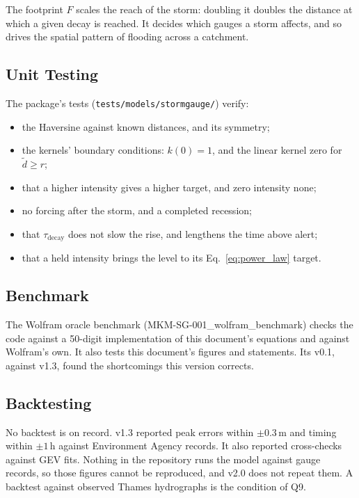 \documentclass[11pt,a4paper]{article}
\begin{document}
The footprint $F$ scales the reach of the storm: doubling it doubles the distance at
which a given decay is reached. It decides which gauges a storm affects, and so drives
the spatial pattern of flooding across a catchment.

\mkmvalidation

\subsection{Unit Testing}

The package's tests (\texttt{tests/models/stormgauge/}) verify:
\begin{itemize}[nosep]
    \item the Haversine against known distances, and its symmetry;
    \item the kernels' boundary conditions: $k(0) = 1$, and the linear kernel zero for
          $\tilde{d} \geq r$;
    \item that a higher intensity gives a higher target, and zero intensity none;
    \item no forcing after the storm, and a completed recession;
    \item that $\tau_{\text{decay}}$ does not slow the rise, and lengthens the time above
          alert;
    \item that a held intensity brings the level to its Eq.~\ref{eq:power_law} target.
\end{itemize}

\subsection{Benchmark}

The Wolfram oracle benchmark (MKM-SG-001\_wolfram\_benchmark) checks the code against a
50-digit implementation of this document's equations and against Wolfram's own. It also
tests this document's figures and statements. Its v0.1, against v1.3, found the
shortcomings this version corrects.

\subsection{Backtesting}

No backtest is on record. v1.3 reported peak errors within $\pm0.3$\,m and timing
within $\pm1$\,h against Environment Agency records. It also reported cross-checks
against GEV fits. Nothing in the repository runs the model against gauge records, so
those figures cannot be reproduced, and v2.0 does not repeat them. A backtest against
observed Thames hydrographs is the condition of Q9.
\end{document}
